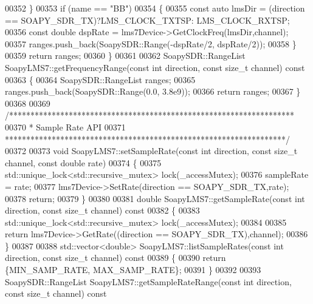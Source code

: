 \begin{DoxyCode}
{{{{{{{{{{{00352     \}
00353     \textcolor{keywordflow}{if} (name == \textcolor{stringliteral}{"BB"})
00354     \{
00355         \textcolor{keyword}{const} \textcolor{keyword}{auto} lmsDir = (direction == SOAPY\_SDR\_TX)?LMS_CLOCK_TXTSP:
      LMS_CLOCK_RXTSP;
00356         \textcolor{keyword}{const} \textcolor{keywordtype}{double} dspRate = lms7Device->GetClockFreq(lmsDir,channel);
00357         ranges.push\_back(SoapySDR::Range(-dspRate/2, dspRate/2));
00358     \}
00359     \textcolor{keywordflow}{return} ranges;
00360 \}
00361 
00362 SoapySDR::RangeList SoapyLMS7::getFrequencyRange(\textcolor{keyword}{const} \textcolor{keywordtype}{int} direction, \textcolor{keyword}{const} \textcolor{keywordtype}{size\_t} channel)\textcolor{keyword}{ const}
00363 \textcolor{keyword}{}\{
00364     SoapySDR::RangeList ranges;
00365     ranges.push\_back(SoapySDR::Range(0.0, 3.8e9));
00366     \textcolor{keywordflow}{return} ranges;
00367 \}
00368 
00369 \textcolor{comment}{/*******************************************************************}
00370 \textcolor{comment}{ * Sample Rate API}
00371 \textcolor{comment}{ ******************************************************************/}
00372 
00373 \textcolor{keywordtype}{void} SoapyLMS7::setSampleRate(\textcolor{keyword}{const} \textcolor{keywordtype}{int} direction, \textcolor{keyword}{const} \textcolor{keywordtype}{size\_t} channel, \textcolor{keyword}{const} \textcolor{keywordtype}{double} 
      rate)
00374 \{
00375     std::unique\_lock<std::recursive\_mutex> lock(_accessMutex);
00376     sampleRate = rate;
00377     lms7Device->SetRate(direction == SOAPY\_SDR\_TX,rate);
00378     \textcolor{keywordflow}{return};
00379 \}
00380 
00381 \textcolor{keywordtype}{double} SoapyLMS7::getSampleRate(\textcolor{keyword}{const} \textcolor{keywordtype}{int} direction, \textcolor{keyword}{const} \textcolor{keywordtype}{size\_t} channel)\textcolor{keyword}{ const}
00382 \textcolor{keyword}{}\{
00383     std::unique\_lock<std::recursive\_mutex> lock(_accessMutex);
00384 
00385     \textcolor{keywordflow}{return} lms7Device->GetRate((direction == SOAPY\_SDR\_TX),channel);
00386 \}
00387 
00388 std::vector<double> SoapyLMS7::listSampleRates(\textcolor{keyword}{const} \textcolor{keywordtype}{int} direction, \textcolor{keyword}{const} \textcolor{keywordtype}{size\_t} channel)\textcolor{keyword}{ const}
00389 \textcolor{keyword}{}\{
00390     \textcolor{keywordflow}{return} \{MIN_SAMP_RATE, MAX_SAMP_RATE\};
00391 \}
00392 
00393 SoapySDR::RangeList SoapyLMS7::getSampleRateRange(\textcolor{keyword}{const} \textcolor{keywordtype}{int} direction, \textcolor{keyword}{const} \textcolor{keywordtype}{size\_t} channel)\textcolor{keyword}{ const}
}}}}}}}}}}}
\end{DoxyCode}
